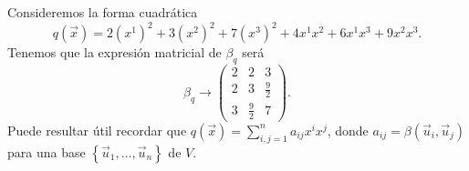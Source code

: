\begin{eg}
\normalfont Consideremos la forma cuadrática 
\[ q\left(\vec{x}\right) = 2\left(x^{1}\right)^{2} + 3\left(x^{2}\right)^{2} + 7\left(x^{3}\right)^{2} + 4x^{1}x^{2} + 6x^{1}x^{3} + 9x^{2}x^{3} .\]
Tenemos que la expresión matricial de $\displaystyle \beta_{q} $ será
\[ \beta_{q} \to \begin{pmatrix} 2 & 2& 3 \\
2& 3 &\frac{9}{2} \\
3&\frac{9}{2}& 7\end{pmatrix} .\]
Puede resultar útil recordar que $\displaystyle q\left(\vec{x}\right) = \sum^{n}_{i,j=1}a_{ij}x^{i}x^{j} $, donde $\displaystyle a_{ij} = \beta\left(\vec{u}_{i}, \vec{u}_{j}\right) $ para una base $\displaystyle \left\{ \vec{u}_{1}, \ldots, \vec{u}_{n}\right\}  $ de $\displaystyle V $.
\end{eg}
